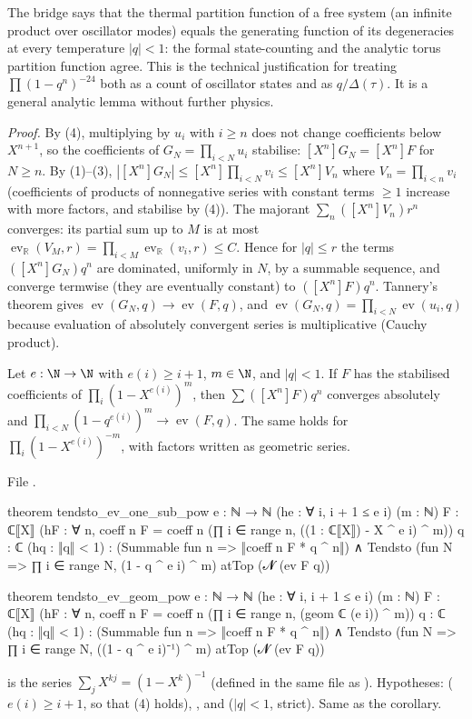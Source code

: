 \begin{physics}
The bridge says that the thermal partition function of a free system (an infinite product over oscillator modes) equals the generating function of its degeneracies at every temperature $|q|<1$: the formal state-counting and the analytic torus partition function agree. This is the technical justification for treating $\prod(1-q^n)^{-24}$ both as a count of oscillator states and as $q/\Delta(\tau)$. It is a general analytic lemma without further physics.
\end{physics}
\noindent\emph{Proof.} By (4), multiplying by $u_i$ with $i\ge n$ does not change coefficients below
$X^{n+1}$, so the coefficients of $G_N = \prod_{i<N}u_i$ stabilise: $[X^n]G_N = [X^n]F$ for $N\ge n$. By
(1)--(3), $|[X^n]G_N|\le[X^n]\prod_{i<N}v_i\le[X^n]V_n$ where $V_n = \prod_{i<n}v_i$ (coefficients of
products of nonnegative series with constant terms $\ge1$ increase with more factors, and stabilise
by (4)). The majorant $\sum_n([X^n]V_n)r^n$ converges: its partial sum up to $M$ is at most
$\operatorname{ev}_{\mathbb R}(V_M,r) = \prod_{i<M}\operatorname{ev}_{\mathbb R}(v_i,r)\le C$. Hence for $|q|\le r$ the
terms $([X^n]G_N)q^n$ are dominated, uniformly in $N$, by a summable sequence, and converge
termwise (they are eventually constant) to $([X^n]F)q^n$. Tannery's theorem gives
$\operatorname{ev}(G_N,q)\to\operatorname{ev}(F,q)$, and $\operatorname{ev}(G_N,q) = \prod_{i<N}\operatorname{ev}(u_i,q)$ because
evaluation of absolutely convergent series is multiplicative (Cauchy product).

\begin{corollary}\label{ch05:cor:shapes}
Let $e:\N\to\N$ with $e(i)\ge i+1$, $m\in\N$, and $|q|<1$. If $F$ has the stabilised coefficients of
$\prod_i(1-X^{e(i)})^m$, then $\sum([X^n]F)q^n$ converges absolutely and $\prod_{i<N}(1-q^{e(i)})^m\to
\operatorname{ev}(F,q)$. The same holds for $\prod_i(1-X^{e(i)})^{-m}$, with factors written as geometric series.
\end{corollary}
\noindent File .
\begin{leancode}
theorem tendsto_ev_one_sub_pow {e : ℕ → ℕ} (he : ∀ i, i + 1 ≤ e i) (m : ℕ) {F : ℂ⟦X⟧}
    (hF : ∀ n, coeff n F = coeff n (∏ i ∈ range n, ((1 : ℂ⟦X⟧) - X ^ e i) ^ m))
    {q : ℂ} (hq : ‖q‖ < 1) :
    (Summable fun n => ‖coeff n F * q ^ n‖)
      ∧ Tendsto (fun N => ∏ i ∈ range N, (1 - q ^ e i) ^ m) atTop (𝓝 (ev F q))

theorem tendsto_ev_geom_pow {e : ℕ → ℕ} (he : ∀ i, i + 1 ≤ e i) (m : ℕ) {F : ℂ⟦X⟧}
    (hF : ∀ n, coeff n F = coeff n (∏ i ∈ range n, (geom ℂ (e i)) ^ m))
    {q : ℂ} (hq : ‖q‖ < 1) :
    (Summable fun n => ‖coeff n F * q ^ n‖)
      ∧ Tendsto (fun N => ∏ i ∈ range N, ((1 - q ^ e i)⁻¹) ^ m) atTop (𝓝 (ev F q))
\end{leancode}
\begin{dictionary}
 is the series $\sum_jX^{kj} = (1-X^k)^{-1}$ (defined in the same file as
). Hypotheses:  ($e(i)\ge i+1$, so that
(4) holds), , and  ($|q|<1$, strict). Same as the corollary.
\end{dictionary}


